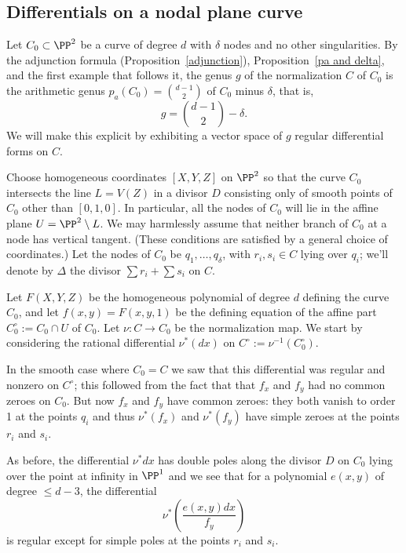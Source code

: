 \subsection{Differentials on a nodal plane curve}\label{canonical series on nodal plane curves}

Let $C_{0} \subset \PP^2$  be a curve of degree $d$ with $\delta$ nodes and no other singularities. By the adjunction
formula (Proposition~\ref{adjunction}), Proposition~\ref{pa and delta}, and the first example that follows it, 
the genus $g$ of the normalization $C$ of $C_{0}$ is
the arithmetic genus $p_{a}(C_{0}) = \binom{d-1}{2}$ of $C_{0}$ minus $\delta$, that is,
$$
g = \binom{d-1}{2} -\delta.
$$
We will make this explicit by exhibiting a vector space of $g$ regular differential forms on $C$.

Choose homogeneous coordinates  $[X,Y,Z]$ on $\PP^2$ so that the curve $C_0$ intersects the line $L = V(Z)$ in a divisor $D$ consisting only of smooth points of $C_{0}$  other than $[0,1,0]$. In particular,  all the nodes of $C_0$ will lie in the affine plane $U = \PP^2 \setminus L$.
We may harmlessly assume that  neither branch of $C_0$ at a node has vertical tangent. (These conditions are satisfied by a general choice of coordinates.) Let the nodes of $C_0$ be $q_1,\dots,q_\delta$, with $r_i, s_i \in C$ lying over $q_i$; we'll denote by $\Delta$ the divisor $\sum r_i + \sum s_i$ on $C$.

Let $F(X,Y,Z)$ be the homogeneous polynomial of degree $d$ defining the curve $C_0$, and let $f(x,y) = F(x,y,1)$ be the defining equation of the affine part $C_{0}^{\circ}:= C_0 \cap U$ of $C_0$. Let $\nu: C\to C_0$ be the normalization map. We start by considering the rational differential 
$\nu^*(dx)$ on 
$C^{\circ}:= \nu^{-1}(C_{0}^{\circ})$. 

In the smooth case where $C_{0}=C$ we saw that this differential was regular and nonzero on $C^{\circ}$; this followed from the fact that 
that $f_{x}$ and $f_{y}$ had no common zeroes on $C_0$. But now $f_{x}$ and $f_{y}$ have common zeroes: they both vanish to order 1 at the points $q_{i}$ and thus $\nu^*(f_{x})$ and $\nu^*(f_{y})$ have simple zeroes at the points $r_i$ and $s_i$. 

As before, the differential $\nu^*dx$ has  double poles along the divisor $D$ on $C_{0}$ lying over the point at infinity in $\PP^{1}$
and we see that for a polynomial $e(x,y)$ of degree $\leq d-3$, the differential
$$
\nu^*\left( \frac{e(x,y)dx}{f_{y}}\right)
$$
is regular except for simple poles at the points $r_i$ and $s_i$.

